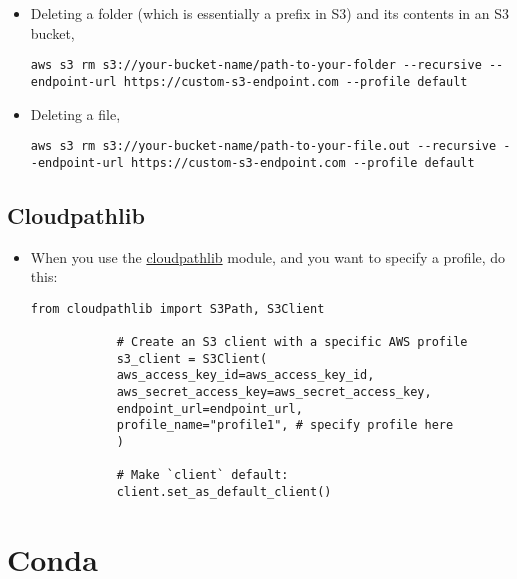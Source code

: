 \documentclass[12pt, a4paper]{scrbook}
\numberwithin{equation}{section}
\theoremstyle{definition}
\theoremstyle{definition}
\begin{document}
	\begin{itemize}
		\item Deleting a folder (which is essentially a prefix in S3) and its contents in
		an S3 bucket, 
		
		\begin{lstlisting}[style=mystylebash, label=alg:aws__dir_rm, xleftmargin=\parindent]
			aws s3 rm s3://your-bucket-name/path-to-your-folder --recursive --endpoint-url https://custom-s3-endpoint.com --profile default
		\end{lstlisting}
		
		\item Deleting a file, 
		
		\begin{lstlisting}[style=mystylebash, label=alg:aws__file_rm, xleftmargin=\parindent]
			aws s3 rm s3://your-bucket-name/path-to-your-file.out --recursive --endpoint-url https://custom-s3-endpoint.com --profile default
		\end{lstlisting}
		
	\end{itemize}
	
	\section{Cloudpathlib}
	
	\begin{itemize}
		\item When you use the \href{https://cloudpathlib.drivendata.org/stable/}{cloudpathlib} module, and you want to specify a profile, do this:
		
		\begin{lstlisting}[style=mystylepython, label=alg:aws__cloudpathlib_profile, xleftmargin=\parindent]
			from cloudpathlib import S3Path, S3Client
			
			# Create an S3 client with a specific AWS profile
			s3_client = S3Client(
			aws_access_key_id=aws_access_key_id,
			aws_secret_access_key=aws_secret_access_key,
			endpoint_url=endpoint_url,
			profile_name="profile1", # specify profile here
			)
			
			# Make `client` default:
			client.set_as_default_client()
		\end{lstlisting}
		
	\end{itemize}
	
	\chapter{Conda}
	
\end{document}
